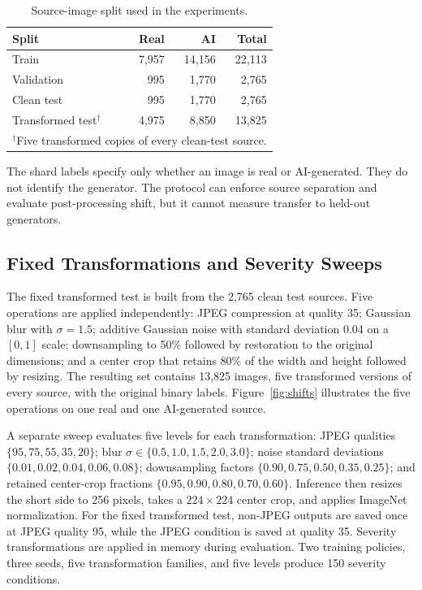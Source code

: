 \documentclass[conference]{IEEEtran}
\begin{document}
\begin{table}[!t]
\centering
\caption{Source-image split used in the experiments.}
\label{tab:split}
\setlength{\tabcolsep}{4.5pt}
\begin{tabular}{lrrr}
\toprule
Split & Real & AI & Total \\
\midrule
Train & 7,957 & 14,156 & 22,113 \\
Validation & 995 & 1,770 & 2,765 \\
Clean test & 995 & 1,770 & 2,765 \\
Transformed test$^{\dagger}$ & 4,975 & 8,850 & 13,825 \\
\bottomrule
\multicolumn{4}{l}{\footnotesize $^{\dagger}$Five transformed copies of every clean-test source.}
\end{tabular}
\end{table}

The shard labels specify only whether an image is real or AI-generated. They
do not identify the generator. The protocol can enforce source separation and
evaluate post-processing shift, but it cannot measure transfer to held-out
generators.

\subsection{Fixed Transformations and Severity Sweeps}

The fixed transformed test is built from the 2,765 clean test sources. Five
operations are applied independently: JPEG compression at quality 35;
Gaussian blur with $\sigma=1.5$; additive Gaussian noise with standard
deviation 0.04 on a $[0,1]$ scale; downsampling to 50\% followed by restoration
to the original dimensions; and a center crop that retains 80\% of the width
and height followed by resizing. The resulting set contains 13,825 images,
five transformed versions of every source, with the original binary labels.
Figure~\ref{fig:shifts} illustrates the five operations on one real and one
AI-generated source.

A separate sweep evaluates five levels for each transformation: JPEG qualities
$\{95,75,55,35,20\}$; blur $\sigma\in\{0.5,1.0,1.5,2.0,3.0\}$; noise standard
deviations $\{0.01,0.02,0.04,0.06,0.08\}$; downsampling factors
$\{0.90,0.75,0.50,0.35,0.25\}$; and retained center-crop fractions
$\{0.95,0.90,0.80,0.70,0.60\}$. Inference then resizes the short side to 256
pixels, takes a $224\times224$ center crop, and applies ImageNet normalization.
For the fixed transformed test, non-JPEG outputs are saved once at JPEG quality
95, while the JPEG condition is saved at quality 35. Severity transformations
are applied in memory during evaluation. Two training policies, three seeds,
five transformation families, and five levels produce 150 severity conditions.
\end{document}

